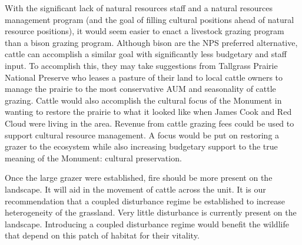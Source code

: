 With the significant lack of natural resources staff and a natural resources management program (and the goal of filling cultural positions ahead of natural resource positions), it would seem easier to enact a livestock grazing program than a bison grazing program. 
Although bison are the NPS preferred alternative, cattle can accomplish a similar goal with significantly less budgetary and staff input. 
To accomplish this, they may take suggestions from Tallgrass Prairie National Preserve who leases a pasture of their land to local cattle owners to manage the prairie to the most conservative AUM and seasonality of cattle grazing.
Cattle would also accomplish the cultural focus of the Monument in wanting to restore the prairie to what it looked like when James Cook and Red Cloud were living in the area.
Revenue from cattle grazing fees could be used to support cultural resource management. 
A focus would be put on restoring a grazer to the ecosystem while also increasing budgetary support to the true meaning of the Monument: cultural preservation.

Once the large grazer were established, fire should be more present on the landscape. 
It will aid in the movement of cattle across the unit. 
It is our recommendation that a coupled disturbance regime be established to increase heterogeneity of the grassland. 
Very little disturbance is currently present on the landscape. 
Introducing a coupled disturbance regime would benefit the wildlife that depend on this patch of habitat for their vitality.
